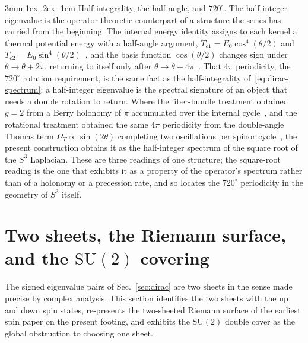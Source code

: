 \documentclass[%
 reprint, amsmath,amssymb, aps, prb, ]{revtex4-2}
\makeatletter
\numberwithin{equation}{section}
\renewcommand\paragraph{%
  \@startsection{paragraph}{4}{\z@}%
    {3mm \@plus 1ex \@minus .2ex}%
    {-1em}%
    {\normalfont\normalsize\itshape}}
\newcommand{\iphase}{\theta}  %
\makeatother
\begin{document}
\paragraph{Half-integrality, the half-angle, and $720^{\circ}$.}
The half-integer eigenvalue is the operator-theoretic counterpart of a structure the series has carried from the beginning. The internal energy identity assigns to each kernel a thermal potential energy with a half-angle argument, $T_{e1}=E_{0}\cos^{4}(\iphase/2)$ and $T_{e2}=E_{0}\sin^{4}(\iphase/2)$~\cite{hanamura01}, and the basis function $\cos(\iphase/2)$ changes sign under $\iphase\to\iphase+2\pi$, returning to itself only after $\iphase\to\iphase+4\pi$~\cite{hanamura48}. That $4\pi$ periodicity, the $720^{\circ}$ rotation requirement, is the same fact as the half-integrality of~\eqref{eq:dirac-spectrum}: a half-integer eigenvalue is the spectral signature of an object that needs a double rotation to return. Where the fiber-bundle treatment obtained $g=2$ from a Berry holonomy of $\pi$ accumulated over the internal cycle~\cite{hanamura48}, and the rotational treatment obtained the same $4\pi$ periodicity from the double-angle Thomas term $\Omega_{T}\propto\sin(2\iphase)$ completing two oscillations per spinor cycle~\cite{hanamura50}, the present construction obtains it as the half-integer spectrum of the square root of the $S^{3}$ Laplacian. These are three readings of one structure; the square-root reading is the one that exhibits it as a property of the operator's spectrum rather than of a holonomy or a precession rate, and so locates the $720^{\circ}$ periodicity in the geometry of $S^{3}$ itself.

\section{Two sheets, the Riemann surface, and the $\mathrm{SU}(2)$ covering}
\label{sec:su2}

The signed eigenvalue pairs of Sec.~\ref{sec:dirac} are two sheets in the sense made precise by complex analysis. This section identifies the two sheets with the up and down spin states, re-presents the two-sheeted Riemann surface of the earliest spin paper on the present footing, and exhibits the $\mathrm{SU}(2)$ double cover as the global obstruction to choosing one sheet.
\end{document}
